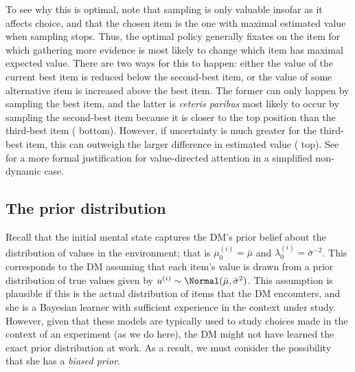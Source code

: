 To see why this is optimal, note that sampling is only valuable insofar as it affects choice, and that the chosen item is the one with maximal estimated value when sampling stops. Thus, the optimal policy generally fixates on the item for which gathering more evidence is most likely to change which item has maximal expected value. There are two ways for this to happen: either the value of the current best item is reduced below the second-best item, or the value of some alternative item is increased above the best item. The former can only happen by sampling the best item, and the latter is \emph{ceteris paribus} most likely to occur by sampling the second-best item because it is closer to the top position than the third-best item ( bottom). However, if uncertainty is much greater for the third-best item, this can outweigh the larger difference in estimated value ( top). See \citet{sepulveda2020visual} for a more formal justification for value-directed attention in a simplified non-dynamic case.

\subsection{The prior distribution}
Recall that the initial mental state captures the DM's prior belief about the distribution of values in the environment; that is $\mu_0^{(i)} = \bar{\mu}$ and $\lambda_0^{(i)} = \bar{\sigma}^{-2}$. This corresponds to the DM assuming that each item's value is drawn from a prior distribution of true values given by $u^{(i)} \sim \Normal(\bar{\mu}, \bar{\sigma}^2)$. This assumption is plausible if this is the actual distribution of items that the DM encounters, and she is a Bayesian learner with sufficient experience in the context under study. However, given that these models are typically used to study choices made in the context of an experiment (as we do here), the DM might not have learned the exact prior distribution at work. As a result, we must consider the possibility that she has a \emph{biased prior}.


